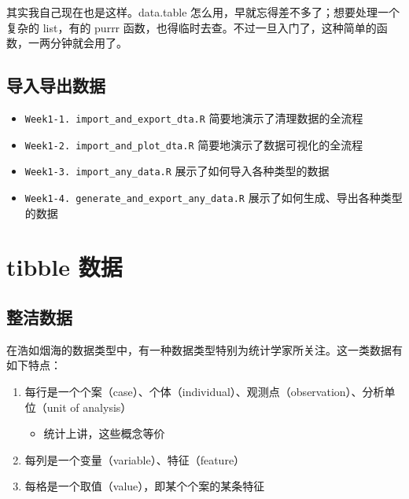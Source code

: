 \documentclass[
  letterpaper,
]{ctexbook}
\providecommand{\tightlist}{%
  \setlength{\itemsep}{0pt}\setlength{\parskip}{0pt}}\usepackage{longtable,booktabs,array}
\begin{document}
其实我自己现在也是这样。data.table
怎么用，早就忘得差不多了；想要处理一个复杂的 list，有的 purrr
函数，也得临时去查。不过一旦入门了，这种简单的函数，一两分钟就会用了。

\hypertarget{ux5bfcux5165ux5bfcux51faux6570ux636e}{%
\section{导入导出数据}\label{ux5bfcux5165ux5bfcux51faux6570ux636e}}

\begin{itemize}
\tightlist
\item
  \texttt{Week1-1.\ import\_and\_export\_dta.R}
  简要地演示了清理数据的全流程
\item
  \texttt{Week1-2.\ import\_and\_plot\_dta.R}
  简要地演示了数据可视化的全流程
\item
  \texttt{Week1-3.\ import\_any\_data.R} 展示了如何导入各种类型的数据
\item
  \texttt{Week1-4.\ generate\_and\_export\_any\_data.R}
  展示了如何生成、导出各种类型的数据
\end{itemize}


\hypertarget{tibble-ux6570ux636e}{%
\chapter{tibble 数据}\label{tibble-ux6570ux636e}}

\hypertarget{ux6574ux6d01ux6570ux636e}{%
\section{整洁数据}\label{ux6574ux6d01ux6570ux636e}}

在浩如烟海的数据类型中，有一种数据类型特别为统计学家所关注。这一类数据有如下特点：

\begin{enumerate}
\def\labelenumi{\arabic{enumi}.}
\tightlist
\item
  每行是一个个案（case）、个体（individual）、观测点（observation）、分析单位（unit
  of analysis）

  \begin{itemize}
  \tightlist
  \item
    统计上讲，这些概念等价
  \end{itemize}
\item
  每列是一个变量（variable）、特征（feature）
\item
  每格是一个取值（value），即某个个案的某条特征
\end{enumerate}
\end{document}
